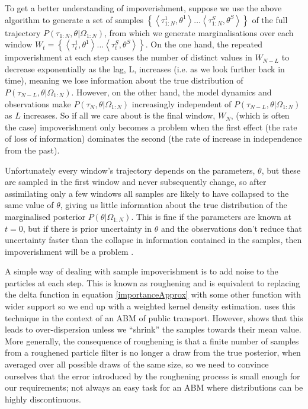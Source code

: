 \documentclass{article}
\begin{document}
To get a better understanding of impoverishment, suppose we use the above algorithm to generate a set of samples $\left\{\left<\tau_{1:N}^1,\theta^1\right> \dots \left<\tau_{1:N}^S,\theta^S\right>\right\}$ of the full trajectory $P(\tau_{1:N},\theta|\Omega_{1:N})$, from which we generate marginalisations over each window $W_t = \left\{\left<\tau_t^1,\theta^1\right> \dots \left<\tau_t^S,\theta^S\right>\right\}$. On the one hand, the repeated impoverishment at each step causes the number of distinct values in $W_{N-L}$ to decrease exponentially as the lag, L, increases (i.e. as we look further back in time), meaning we lose information about the true distribution of $P(\tau_{N-L},\theta|\Omega_{1:N})$. However, on the other hand, the model dynamics and observations make $P(\tau_{N},\theta|\Omega_{1:N})$ increasingly independent of $P(\tau_{N-L},\theta|\Omega_{1:N})$ as $L$ increases. So if all we care about is the final window, $W_N$, (which is often the case) impoverishment only becomes a problem when the first effect (the rate of loss of information) dominates the second (the rate of increase in independence from the past).
  
Unfortunately every window's trajectory depends on the parameters, $\theta$, but these are sampled in the first window and never subsequently change, so after assimilating only a few windows all samples are likely to have collapsed to the same value of $\theta$, giving us little information about the true distribution of the marginalised posterior $P(\theta|\Omega_{1:N})$. This is fine if the parameters are known at $t=0$, but if there is prior uncertainty in $\theta$ and the observations don't reduce that uncertainty faster than the collapse in information contained in the samples, then impoverishment will be a problem \citep*{liu2001combined, andrieu2004particle}.

A simple way of dealing with sample impoverishment is to add noise to the particles at each step. This is known as roughening \citep*{gordon1993novel, li2014fight} and is equivalent to replacing the delta function in equation \eqref{importanceApprox} with some other function with wider support so we end up with a weighted kernel density estimation. \citet{kieu_dealing_2020} uses this technique in the context of an ABM of public transport. However, \citet{liu2001combined} shows that this leads to over-dispersion unless we ``shrink'' the samples towards their mean value. More generally, the consequence of roughening is that a finite number of samples from a roughened particle filter is no longer a draw from the true posterior, when averaged over all possible draws of the same size, so we need to convince ourselves that the error introduced by the roughening process is small enough for our requirements; not always an easy task for an ABM where distributions can be highly discontinuous.
\end{document}

